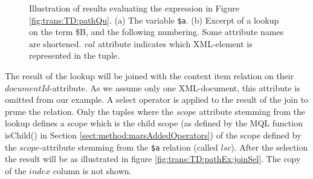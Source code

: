 \begin{myExample}
\begin{figure}[h]
\centering
{}
\qquad
{}
\caption[Evaluating the expression of Figure \ref{fig:trans:TD:pathQu}]{Illustration of results evaluating the
expression in Figure \ref{fig:trans:TD:pathQu}. (a) The variable \texttt{\$a}.
(b) Excerpt of a lookup on the term \textsf{\$B}, and the following numbering. Some attribute names are shortened. $val$ attribute indicates which
XML-element is represented in the tuple.
\label{fig:trans:TD:pathEx}}
\end{figure}

The result of the lookup will be joined with the context item relation on their $documentId$-attribute. As we
assume only one XML-document, this attribute is omitted from our example. A \textsf{select} operator is applied to
the result of the join to prune the relation. Only the tuples where the $scope$ attribute stemming from the lookup
defines a scope which is the child scope (as defined by the MQL function
\textsf{isChild()} in Section \ref{sect:method:marsAddedOperators}) of the scope defined by the $scope$-attribute stemming from the
\texttt{\$a} relation (called $lsc$). After the selection the result will be as illustrated in figure
\ref{fig:trans:TD:pathEx:joinSel}. The copy of the $index$ column is not shown.


\end{myExample}
